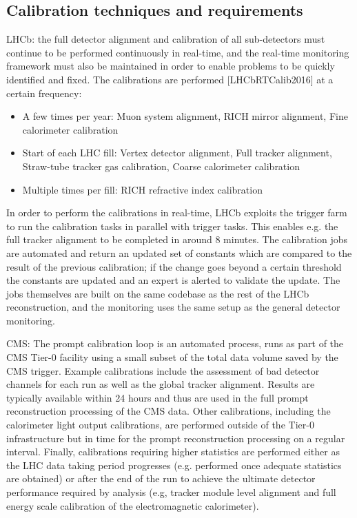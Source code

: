 \subsection{Calibration techniques and requirements}
LHCb: the full detector alignment and calibration of all sub-detectors must continue to be performed continuously in real-time, and the real-time monitoring framework must also be maintained in order to enable problems to be quickly identified and fixed. The calibrations are performed [LHCbRTCalib2016] at a certain frequency:
\begin{itemize}
\item
A few times per year: Muon system alignment, RICH mirror alignment, Fine calorimeter calibration 
\item
Start of each LHC fill: Vertex detector alignment, Full tracker alignment, Straw-tube tracker gas calibration, Coarse calorimeter calibration
\item
Multiple times per fill: RICH refractive index calibration
\end{itemize}
In order to perform the calibrations in real-time, LHCb exploits the trigger farm to run the calibration tasks in parallel with trigger tasks. This enables e.g. the full tracker alignment to be completed in around 8 minutes. The calibration jobs are automated and return an updated set of constants which are compared to the result of the previous calibration; if the change goes beyond a certain threshold the constants are updated and an expert is alerted to validate the update. The jobs themselves are built on the same codebase as the rest of the LHCb reconstruction, and the monitoring uses the same setup as the general detector monitoring.

CMS: The prompt calibration loop is an automated process, runs as part of the CMS Tier-0 facility using a small subset of the total data volume saved by the CMS trigger. Example calibrations include the assessment of bad detector channels for each run as well as the global tracker alignment. Results are typically available within 24 hours and thus are used in the full prompt reconstruction processing of the CMS data. Other calibrations, including the calorimeter light output calibrations, are performed outside of the Tier-0 infrastructure but in time for the prompt reconstruction processing on a regular interval. Finally, calibrations requiring higher statistics are performed either as the LHC data taking period progresses (e.g. performed once adequate statistics are obtained) or after the end of the run to achieve the ultimate detector performance required by analysis (e.g, tracker module level alignment and full energy scale calibration of the electromagnetic calorimeter). 

